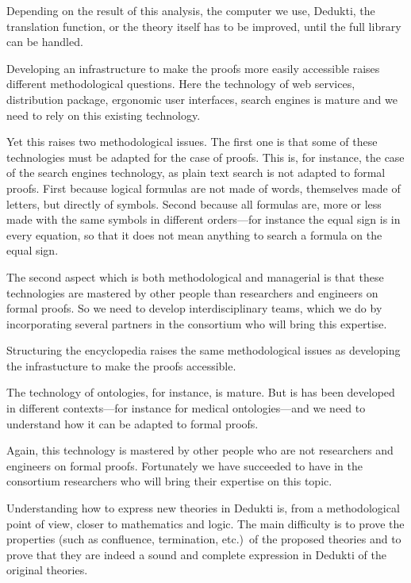 Depending on the result of this analysis, the computer we use, Dedukti,
the translation function, or the theory itself has to be improved, until
the full library can be handled.


Developing an infrastructure to make the proofs more easily accessible
raises different methodological questions. Here the technology of web
services, distribution package, ergonomic user interfaces, search
engines is mature and we need to rely on this existing technology.

Yet this raises two methodological issues. The first one is that some of
these technologies must be adapted for the case of proofs. This is,
for instance, the case of the search engines technology, as plain text
search is not adapted to formal proofs. First because logical formulas
are not made of words, themselves made of letters, but directly of
symbols. Second because all formulas are, more or less made with the
same symbols in different orders---for instance the equal sign is in
every equation, so that it does not mean anything to search a formula
on the equal sign.

The second aspect which is both methodological and managerial is that
these technologies are mastered by other people than researchers and
engineers on formal proofs. So we need to develop interdisciplinary
teams, which we do by incorporating several partners in the consortium
who will bring this expertise.


Structuring the encyclopedia raises the same methodological issues
as developing the infrastucture to make the proofs accessible.

The technology of ontologies, for instance, is mature. But is has been
developed in different contexts---for instance for medical
ontologies---and we need to understand how it can be adapted to formal
proofs.

Again, this technology is mastered by other people who are not
researchers and engineers on formal proofs. Fortunately we have
succeeded to have in the consortium researchers who will bring their
expertise on this topic.


Understanding how to express new theories in Dedukti is, from a
methodological point of view, closer to mathematics and logic.  The
main difficulty is to prove the properties (such as confluence,
termination, etc.)~of the proposed theories and to prove that they are
indeed a sound and complete expression in Dedukti of the original
theories.

